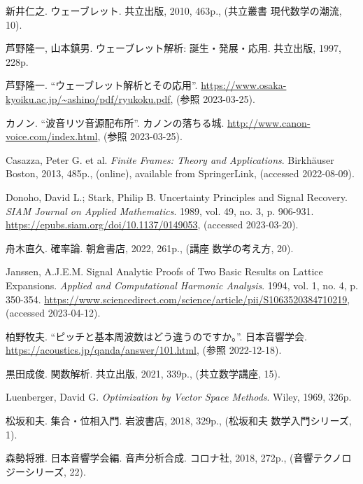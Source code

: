 \documentclass[../../main]{subfiles}
\begin{document}
{}
\begin{thebibliography}{99}
    新井仁之. ウェーブレット. 共立出版, 2010, 463p., (共立叢書 現代数学の潮流, 10).

    芦野隆一, 山本鎮男. ウェーブレット解析: 誕生・発展・応用. 共立出版, 1997, 228p.

    芦野隆一. “ウェーブレット解析とその応用”. \url{https://www.osaka-kyoiku.ac.jp/~ashino/pdf/ryukoku.pdf}, (参照 2023-03-25).

    カノン. “波音リツ音源配布所”. カノンの落ちる城. \url{http://www.canon-voice.com/index.html}, (参照 2023-03-25).

    Casazza, Peter G. et al. \textit{Finite Frames: Theory and Applications}. Birkhäuser Boston, 2013, 485p., (online), available from SpringerLink, (accessed 2022-08-09).

    Donoho, David L.; Stark, Philip B. Uncertainty Principles and Signal Recovery. \textit{SIAM Journal on Applied Mathematics}. 1989, vol. 49, no. 3, p. 906-931. \url{https://epubs.siam.org/doi/10.1137/0149053}, (accessed 2023-03-20).

    舟木直久. 確率論. 朝倉書店, 2022, 261p., (講座 数学の考え方, 20).

    Janssen, A.J.E.M. Signal Analytic Proofs of Two Basic Results on Lattice Expansions. \textit{Applied and Computational Harmonic Analysis}. 1994, vol. 1, no. 4, p. 350-354. \url{https://www.sciencedirect.com/science/article/pii/S1063520384710219}, (accessed 2023-04-12).

    柏野牧夫. “ピッチと基本周波数はどう違うのですか。”. 日本音響学会. \url{https://acoustics.jp/qanda/answer/101.html}, (参照 2022-12-18).

    黒田成俊. 関数解析. 共立出版, 2021, 339p., (共立数学講座, 15).

    Luenberger, David G. \textit{Optimization by Vector Space Methods}. Wiley, 1969, 326p.

    松坂和夫. 集合・位相入門. 岩波書店, 2018, 329p., (松坂和夫 数学入門シリーズ, 1).

    森勢将雅. 日本音響学会編. 音声分析合成. コロナ社, 2018, 272p., (音響テクノロジーシリーズ, 22).


\end{thebibliography}
\end{document}
